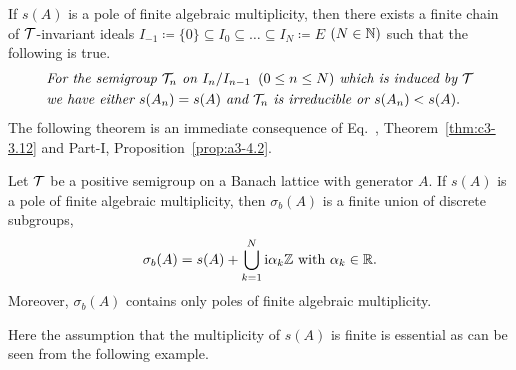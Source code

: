 If\/ $s(A)$ is a pole of finite algebraic multiplicity, then there exists a finite chain of\/ $\mathcal{T}$-invariant ideals $I_{-1} \coloneq  \{0\} \subseteq I_{0}\subseteq \ldots \subseteq I_{N} \coloneq  E$ $(N\in\mathbb{N})$ such that the following is true.
\begin{equation}\label{eq:c3-3.19}
	\begin{split}
	&\textit{For the semigroup $\TT_{n}$ on $I_{n}/I_{n-1}\, \ (0 \leq n \leq N)$ which is induced by $\TT$}
		\\
	& \textit{we have either $s(A_{n}) = s(A)$ and $\TT_{n}$ is irreducible or $s(A_{n}) < s(A)$} .
	\end{split}
\end{equation}
The following theorem is an immediate consequence of Eq.~, Theorem~\ref{thm:c3-3.12} and Part-I, Proposition~\ref{prop:a3-4.2}.
\begin{theorem}\label{thm:c3-3.14}
%
	Let $\mathcal{T}$ be a positive semigroup on a Banach lattice with generator $A$. 
	If\/ $s(A)$ is a pole of finite algebraic multiplicity, then $\sigma_{b}(A)$ is a finite union of discrete subgroups, \ie  
%
\[
		\sigma_{b}(A) = s(A) + \bigcup_{k=1}^{N}\mathrm{i}\alpha_{k}\mathbb{Z} \text{ with $\alpha_{k} \in \mathbb{R}$.}
\]
%
Moreover, $\sigma_{b}(A)$ contains only poles of finite algebraic multiplicity.
\end{theorem}
Here the assumption that the multiplicity of\/ $s(A)$ is finite is essential as can be seen from the following example.
